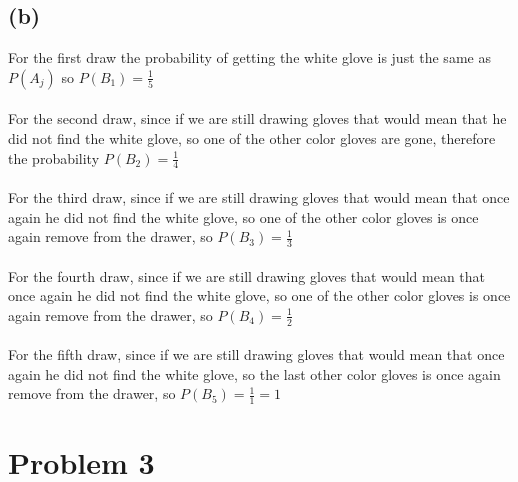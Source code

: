 \subsection*{(b)}
For the first draw the probability of getting the white glove is
just the same as $P(A_j)$ so $P(B_1)=\frac{1}{5}$\\\\
For the second draw, since if we are still drawing gloves that would
mean that he did not find the white glove, so one of the other color gloves
are gone, therefore the probability $P(B_2)=\frac{1}{4}$\\\\
For the third draw, since if we are still drawing gloves that would
mean that once again he did not find the white glove, so one of the other color gloves
is once again remove from the drawer, so $P(B_3)=\frac{1}{3}$\\\\
For the fourth draw, since if we are still drawing gloves that would
mean that once again he did not find the white glove, so one of the other color gloves
is once again remove from the drawer, so $P(B_4)=\frac{1}{2}$\\\\
For the fifth draw, since if we are still drawing gloves that would
mean that once again he did not find the white glove, so the last
other color gloves
is once again remove from the drawer, so $P(B_5)=\frac{1}{1}=1$
\section*{Problem 3}

